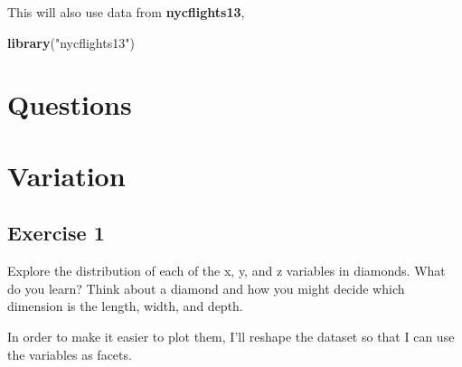 \documentclass[]{book}
\newenvironment{Shaded}{\begin{snugshade}}{\end{snugshade}}
\newcommand{\DataTypeTok}[1]{\textcolor[rgb]{0.13,0.29,0.53}{#1}}
\newcommand{\KeywordTok}[1]{\textcolor[rgb]{0.13,0.29,0.53}{\textbf{#1}}}
\newcommand{\NormalTok}[1]{#1}
\newcommand{\OperatorTok}[1]{\textcolor[rgb]{0.81,0.36,0.00}{\textbf{#1}}}
\newcommand{\StringTok}[1]{\textcolor[rgb]{0.31,0.60,0.02}{#1}}
\theoremstyle{plain}
\theoremstyle{remark}
\theoremstyle{definition}
\theoremstyle{definition}
\theoremstyle{definition}
\theoremstyle{remark}
\begin{document}
This will also use data from \textbf{nycflights13},

\begin{Shaded}
\begin{Highlighting}[]
\KeywordTok{library}\NormalTok{(}\StringTok{"nycflights13"}\NormalTok{)}
\end{Highlighting}
\end{Shaded}

\hypertarget{questions}{%
\section{Questions}\label{questions}}

\hypertarget{variation}{%
\section{Variation}\label{variation}}

\hypertarget{exercise-1-13}{%
\subsection{Exercise 1}\label{exercise-1-13}}

Explore the distribution of each of the x, y, and z variables in
diamonds. What do you learn? Think about a diamond and how you might
decide which dimension is the length, width, and depth.

In order to make it easier to plot them, I'll reshape the dataset so
that I can use the variables as facets.

\begin{Shaded}
\end{Shaded}
\end{document}
